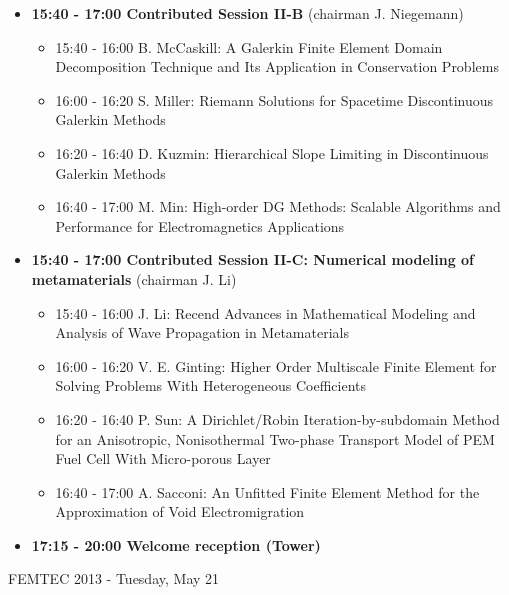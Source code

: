 \documentclass[10pt, A4]{article}%
\begin{document}
\begin{itemize}
\begin{itemize}
  \end{itemize}
  \item {\bf 15:40 - 17:00 Contributed Session II-B} (chairman J. Niegemann) 
  \begin{itemize}
    \item 15:40 - 16:00 {B. McCaskill}: {A Galerkin Finite Element Domain Decomposition Technique and Its Application in Conservation Problems}
    \item 16:00 - 16:20 {S. Miller}: {Riemann Solutions for Spacetime Discontinuous Galerkin Methods}
    \item 16:20 - 16:40 {D. Kuzmin}: {Hierarchical Slope Limiting in Discontinuous Galerkin Methods}
    \item 16:40 - 17:00 {M. Min}: {High-order DG Methods: Scalable Algorithms and Performance for Electromagnetics Applications}
  \end{itemize}
    \item {\bf 15:40 - 17:00 Contributed Session II-C: Numerical modeling of metamaterials} (chairman J. Li) 
  \begin{itemize}
    \item 15:40 - 16:00 {J. Li}: {Recend Advances in Mathematical Modeling and Analysis of Wave Propagation in Metamaterials} %
    \item 16:00 - 16:20 {V. E. Ginting}: {Higher Order Multiscale Finite Element for Solving Problems With Heterogeneous Coefficients}
    \item 16:20 - 16:40 {P. Sun}: A Dirichlet/Robin Iteration-by-subdomain Method for an Anisotropic, Nonisothermal Two-phase Transport Model of PEM Fuel Cell With Micro-porous Layer
    \item 16:40 - 17:00 {A. Sacconi}: {An Unfitted Finite Element Method for the Approximation of Void Electromigration}
  \end{itemize}    
  \item {\bf 17:15 - 20:00 Welcome reception (Tower)} 
\end{itemize}

\newpage

\centerline{\huge FEMTEC 2013 - Tuesday, May 21}
\vspace{4mm}
\end{document}
